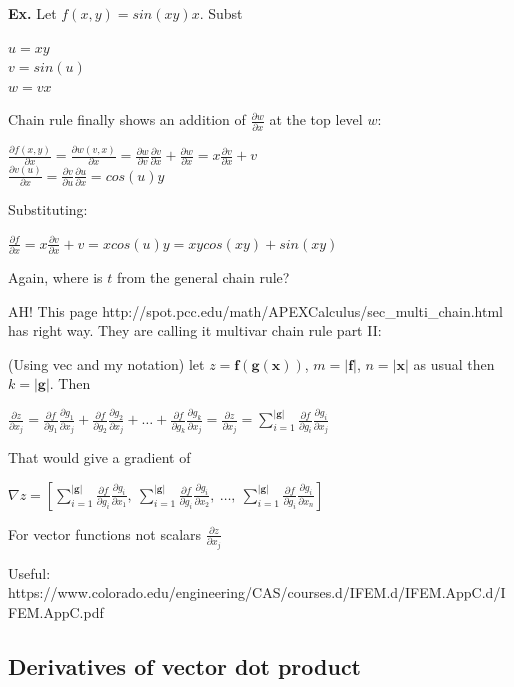 \documentclass[11pt]{article}
\begin{document}
{\bf Ex.} Let $f(x,y) = sin(xy)x$. Subst

$u = xy$\\
$v = sin(u)$\\
$w = vx$

Chain rule finally shows an addition of $\frac{\partial w}{\partial x}$ at the top level $w$:

$\frac{\partial f(x,y)}{\partial x} = \frac{\partial w(v,x)}{\partial x} = \frac{\partial w}{\partial v}\frac{\partial v}{\partial x} + \frac{\partial w}{\partial x} = x\frac{\partial v}{\partial x} + v$\\
$\frac{\partial v(u)}{\partial x} = \frac{\partial v}{\partial u}\frac{\partial u}{\partial x} = cos(u)y$

Substituting:

$\frac{\partial f}{\partial x} = x\frac{\partial v}{\partial x} + v = xcos(u)y = xycos(xy) + sin(xy)$

Again, where is $t$ from the general chain rule?

AH! This page http://spot.pcc.edu/math/APEXCalculus/sec\_multi\_chain.html has right way. They are calling it multivar chain rule part II:

(Using vec and my notation) let $z = \mathbf{f(g(x))}$, $m = |\mathbf{f}|$, $n=|\mathbf{x}|$ as usual then $k=|\mathbf{g}|$. Then

$\frac{\partial z}{\partial x_j} = \frac{\partial f}{\partial g_1}\frac{\partial g_1}{\partial x_j} + \frac{\partial f}{\partial g_2}\frac{\partial g_2}{\partial x_j} + \ldots + \frac{\partial f}{\partial g_k}\frac{\partial g_k}{\partial x_j} = \frac{\partial z}{\partial x_j} =  \sum_{i=1}^{|\mathbf{g}|} \frac{\partial f}{\partial g_i}\frac{\partial g_i}{\partial x_j}$

That would give a gradient of

$\nabla z = \left[ \sum_{i=1}^{|\mathbf{g}|} \frac{\partial f}{\partial g_i}\frac{\partial g_i}{\partial x_1},~ \sum_{i=1}^{|\mathbf{g}|} \frac{\partial f}{\partial g_i}\frac{\partial g_i}{\partial x_2}, ~\ldots,~ \sum_{i=1}^{|\mathbf{g}|} \frac{\partial f}{\partial g_i}\frac{\partial g_i}{\partial x_n} \right]$

For vector functions not scalars
$\frac{\partial z}{\partial x_j}$

Useful: https://www.colorado.edu/engineering/CAS/courses.d/IFEM.d/IFEM.AppC.d/IFEM.AppC.pdf

\pagebreak

\subsection{Derivatives of vector dot product}
\end{document}
